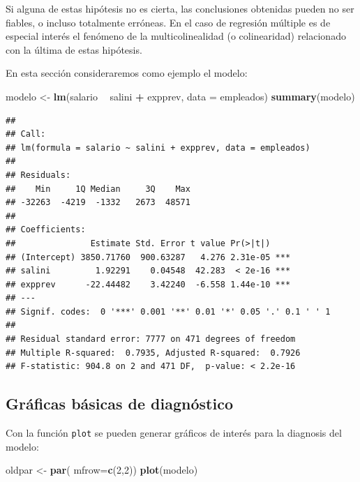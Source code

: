 \documentclass[]{book}
\newenvironment{Shaded}{\begin{snugshade}}{\end{snugshade}}
\newcommand{\KeywordTok}[1]{\textcolor[rgb]{0.13,0.29,0.53}{\textbf{#1}}}
\newcommand{\DataTypeTok}[1]{\textcolor[rgb]{0.13,0.29,0.53}{#1}}
\newcommand{\DecValTok}[1]{\textcolor[rgb]{0.00,0.00,0.81}{#1}}
\newcommand{\StringTok}[1]{\textcolor[rgb]{0.31,0.60,0.02}{#1}}
\newcommand{\OperatorTok}[1]{\textcolor[rgb]{0.81,0.36,0.00}{\textbf{#1}}}
\newcommand{\NormalTok}[1]{#1}
\begin{document}
Si alguna de estas hipótesis no es cierta, las conclusiones obtenidas
pueden no ser fiables, o incluso totalmente erróneas. En el caso de
regresión múltiple es de especial interés el fenómeno de la
multicolinealidad (o colinearidad) relacionado con la última de estas
hipótesis.

En esta sección consideraremos como ejemplo el modelo:

\begin{Shaded}
\begin{Highlighting}[]
\NormalTok{modelo <-}\StringTok{ }\KeywordTok{lm}\NormalTok{(salario }\OperatorTok{~}\StringTok{ }\NormalTok{salini }\OperatorTok{+}\StringTok{ }\NormalTok{expprev, }\DataTypeTok{data =}\NormalTok{ empleados)}
\KeywordTok{summary}\NormalTok{(modelo)   }
\end{Highlighting}
\end{Shaded}

\begin{verbatim}
## 
## Call:
## lm(formula = salario ~ salini + expprev, data = empleados)
## 
## Residuals:
##    Min     1Q Median     3Q    Max 
## -32263  -4219  -1332   2673  48571 
## 
## Coefficients:
##               Estimate Std. Error t value Pr(>|t|)    
## (Intercept) 3850.71760  900.63287   4.276 2.31e-05 ***
## salini         1.92291    0.04548  42.283  < 2e-16 ***
## expprev      -22.44482    3.42240  -6.558 1.44e-10 ***
## ---
## Signif. codes:  0 '***' 0.001 '**' 0.01 '*' 0.05 '.' 0.1 ' ' 1
## 
## Residual standard error: 7777 on 471 degrees of freedom
## Multiple R-squared:  0.7935, Adjusted R-squared:  0.7926 
## F-statistic: 904.8 on 2 and 471 DF,  p-value: < 2.2e-16
\end{verbatim}

\subsection{Gráficas básicas de
diagnóstico}\label{graficas-basicas-de-diagnostico}

Con la función \texttt{plot} se pueden generar gráficos de interés para
la diagnosis del modelo:

\begin{Shaded}
\begin{Highlighting}[]
\NormalTok{oldpar <-}\StringTok{ }\KeywordTok{par}\NormalTok{( }\DataTypeTok{mfrow=}\KeywordTok{c}\NormalTok{(}\DecValTok{2}\NormalTok{,}\DecValTok{2}\NormalTok{))}
\KeywordTok{plot}\NormalTok{(modelo)}
\end{Highlighting}
\end{Shaded}
\end{document}
